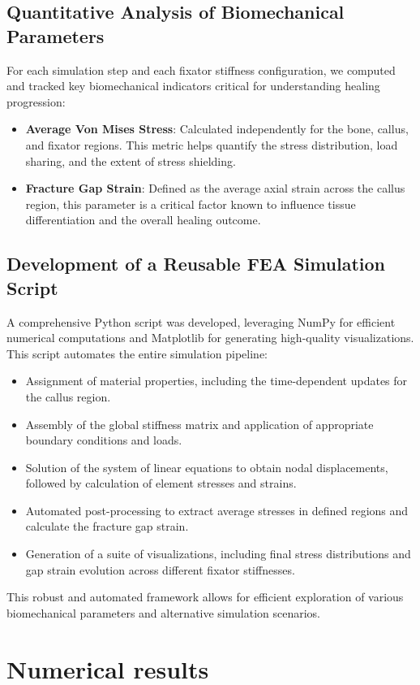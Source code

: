 \documentclass{article}
\begin{document}
\subsection{Quantitative Analysis of Biomechanical Parameters}
For each simulation step and each fixator stiffness configuration, we computed and tracked key biomechanical indicators critical for understanding healing progression:
\begin{itemize}
  \item \textbf{Average Von Mises Stress}: Calculated independently for the bone, callus, and fixator regions. This metric helps quantify the stress distribution, load sharing, and the extent of stress shielding.
  \item \textbf{Fracture Gap Strain}: Defined as the average axial strain across the callus region, this parameter is a critical factor known to influence tissue differentiation and the overall healing outcome.
\end{itemize}

\subsection{Development of a Reusable FEA Simulation Script}
A comprehensive Python script was developed, leveraging NumPy for efficient numerical computations and Matplotlib for generating high-quality visualizations. This script automates the entire simulation pipeline:
\begin{itemize}
  \item Assignment of material properties, including the time-dependent updates for the callus region.
  \item Assembly of the global stiffness matrix and application of appropriate boundary conditions and loads.
  \item Solution of the system of linear equations to obtain nodal displacements, followed by calculation of element stresses and strains.
  \item Automated post-processing to extract average stresses in defined regions and calculate the fracture gap strain.
  \item Generation of a suite of visualizations, including final stress distributions and gap strain evolution across different fixator stiffnesses.
\end{itemize}
This robust and automated framework allows for efficient exploration of various biomechanical parameters and alternative simulation scenarios.

\section{Numerical results}
\end{document}
